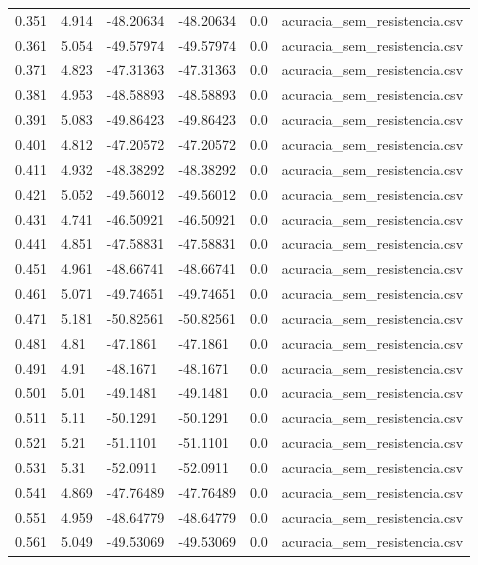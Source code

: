 \begin{table}
\begin{tabular}{llllll}
0.351 & 4.914 & -48.20634 & -48.20634 & 0.0 & acuracia\_sem\_resistencia.csv \\
0.361 & 5.054 & -49.57974 & -49.57974 & 0.0 & acuracia\_sem\_resistencia.csv \\
0.371 & 4.823 & -47.31363 & -47.31363 & 0.0 & acuracia\_sem\_resistencia.csv \\
0.381 & 4.953 & -48.58893 & -48.58893 & 0.0 & acuracia\_sem\_resistencia.csv \\
0.391 & 5.083 & -49.86423 & -49.86423 & 0.0 & acuracia\_sem\_resistencia.csv \\
0.401 & 4.812 & -47.20572 & -47.20572 & 0.0 & acuracia\_sem\_resistencia.csv \\
0.411 & 4.932 & -48.38292 & -48.38292 & 0.0 & acuracia\_sem\_resistencia.csv \\
0.421 & 5.052 & -49.56012 & -49.56012 & 0.0 & acuracia\_sem\_resistencia.csv \\
0.431 & 4.741 & -46.50921 & -46.50921 & 0.0 & acuracia\_sem\_resistencia.csv \\
0.441 & 4.851 & -47.58831 & -47.58831 & 0.0 & acuracia\_sem\_resistencia.csv \\
0.451 & 4.961 & -48.66741 & -48.66741 & 0.0 & acuracia\_sem\_resistencia.csv \\
0.461 & 5.071 & -49.74651 & -49.74651 & 0.0 & acuracia\_sem\_resistencia.csv \\
0.471 & 5.181 & -50.82561 & -50.82561 & 0.0 & acuracia\_sem\_resistencia.csv \\
0.481 & 4.81 & -47.1861 & -47.1861 & 0.0 & acuracia\_sem\_resistencia.csv \\
0.491 & 4.91 & -48.1671 & -48.1671 & 0.0 & acuracia\_sem\_resistencia.csv \\
0.501 & 5.01 & -49.1481 & -49.1481 & 0.0 & acuracia\_sem\_resistencia.csv \\
0.511 & 5.11 & -50.1291 & -50.1291 & 0.0 & acuracia\_sem\_resistencia.csv \\
0.521 & 5.21 & -51.1101 & -51.1101 & 0.0 & acuracia\_sem\_resistencia.csv \\
0.531 & 5.31 & -52.0911 & -52.0911 & 0.0 & acuracia\_sem\_resistencia.csv \\
0.541 & 4.869 & -47.76489 & -47.76489 & 0.0 & acuracia\_sem\_resistencia.csv \\
0.551 & 4.959 & -48.64779 & -48.64779 & 0.0 & acuracia\_sem\_resistencia.csv \\
0.561 & 5.049 & -49.53069 & -49.53069 & 0.0 & acuracia\_sem\_resistencia.csv \\

\end{tabular}
\end{table}
